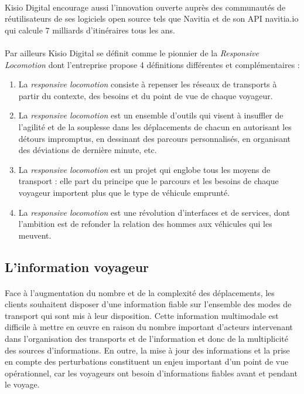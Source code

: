 \documentclass[a4paper]{report}
\begin{document}
\paragraph{} Kisio Digital encourage aussi l'innovation ouverte auprès des communautés de réutilisateurs de ses logiciels open source tels que Navitia et de son API navitia.io qui calcule 7 milliards d'itinéraires tous les ans.

\paragraph{} Par ailleurs Kisio Digital se définit comme le pionnier de la \emph{Responsive Locomotion} dont l'entreprise propose 4 définitions différentes et complémentaires\cite{ref_canal_tp} :

\begin{enumerate}
	\item La \emph{responsive locomotion} consiste à repenser les réseaux de transports à partir du contexte, des besoins et du point de vue de chaque voyageur.
	\item La \emph{responsive locomotion} est un ensemble d'outils qui visent à insuffler de l'agilité et de la souplesse dans les déplacements de chacun en autorisant les détours impromptus, en dessinant des parcours personnalisés, en organisant des déviations de dernière minute, etc.
	\item La \emph{responsive locomotion} est un projet qui englobe tous les moyens de transport : elle part du principe que le parcours et les besoins de chaque voyageur importent plus que le type de véhicule emprunté.
	\item La \emph{responsive locomotion} est une révolution d'interfaces et de services, dont l'ambition est de refonder la relation des hommes aux véhicules qui les meuvent.
\end{enumerate}

\subsection{L'information voyageur}

\paragraph{} Face à l'augmentation du nombre et de la complexité des déplacements, les clients souhaitent disposer d'une information fiable sur l'ensemble des modes de transport qui sont mis à leur disposition. Cette information multimodale est difficile à mettre en œuvre en raison du nombre important d'acteurs intervenant dans l'organisation des transports et de l'information et donc de la multiplicité des sources d’informations. En outre, la mise à jour des informations et la prise en compte des perturbations constituent un enjeu important d'un point de vue opérationnel, car les voyageurs ont besoin d'informations fiables avant et pendant le voyage.  
\end{document}
